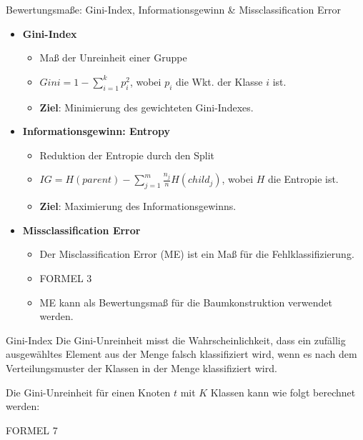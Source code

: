 \documentclass{beamer}
\begin{document}
\begin{frame}{Bewertungsmaße: Gini-Index, Informationsgewinn \& Missclassification Error}
	\begin{itemize}
		\item{\textbf{Gini-Index}}
		\begin{itemize}
			\item Maß der Unreinheit einer Gruppe
			\item $Gini = 1 - \sum_{i=1}^k p_i^2$, wobei $p_i$ die Wkt. der Klasse $i$ ist.
			\item \textbf{Ziel}: Minimierung des gewichteten Gini-Indexes.
		\end{itemize}
		\item{\textbf{Informationsgewinn: Entropy}}
		\begin{itemize}
			\item Reduktion der Entropie durch den Split
			\item $IG = H(parent) - \sum_{j=1}^m \frac{n_j}{n} H(child_j)$, wobei $H$ die Entropie ist.
			\item \textbf{Ziel}: Maximierung des Informationsgewinns.
		\end{itemize}
		\item{\textbf{Missclassification Error}}
		\begin{itemize}
			\item {Der Misclassification Error (ME) ist ein Maß für die Fehlklassifizierung.}
			\item FORMEL 3
			\item {ME kann als Bewertungsmaß für die Baumkonstruktion verwendet werden.}
		\end{itemize}
	\end{itemize}
\end{frame}

\begin{frame}{Gini-Index}
Die Gini-Unreinheit misst die Wahrscheinlichkeit, dass ein zufällig ausgewähltes Element aus der Menge falsch klassifiziert wird, wenn es nach dem Verteilungsmuster der Klassen in der Menge klassifiziert wird.

Die Gini-Unreinheit für einen Knoten $t$ mit $K$ Klassen kann wie folgt berechnet werden:

FORMEL 7


\end{frame}

\end{document}
